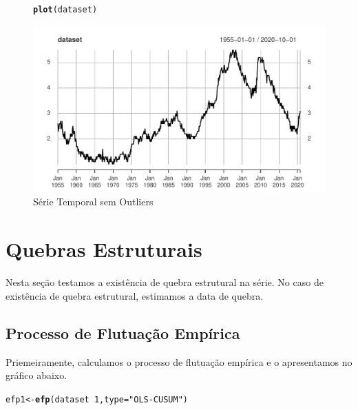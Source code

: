 \documentclass{article}\usepackage[]{graphicx}\usepackage[]{color}
\makeatletter
\def\maxwidth{ %
  \ifdim\Gin@nat@width>\linewidth
    \linewidth
  \else
    \Gin@nat@width
  \fi
}
\newcommand{\hlnum}[1]{\textcolor[rgb]{0.686,0.059,0.569}{#1}}%
\newcommand{\hlstr}[1]{\textcolor[rgb]{0.192,0.494,0.8}{#1}}%
\newcommand{\hlopt}[1]{\textcolor[rgb]{0,0,0}{#1}}%
\newcommand{\hlstd}[1]{\textcolor[rgb]{0.345,0.345,0.345}{#1}}%
\newcommand{\hlkwb}[1]{\textcolor[rgb]{0.69,0.353,0.396}{#1}}%
\newcommand{\hlkwc}[1]{\textcolor[rgb]{0.333,0.667,0.333}{#1}}%
\newcommand{\hlkwd}[1]{\textcolor[rgb]{0.737,0.353,0.396}{\textbf{#1}}}%
\newenvironment{kframe}{%
 \def\at@end@of@kframe{}%
 \ifinner\ifhmode%
  \def\at@end@of@kframe{\end{minipage}}%
  \begin{minipage}{\columnwidth}%
 \fi\fi%
 \def\FrameCommand##1{\hskip\@totalleftmargin \hskip-\fboxsep
 \colorbox{shadecolor}{##1}\hskip-\fboxsep
     \hskip-\linewidth \hskip-\@totalleftmargin \hskip\columnwidth}%
 \MakeFramed {\advance\hsize-\width
   \@totalleftmargin\z@ \linewidth\hsize
   \@setminipage}}%
 {\par\unskip\endMakeFramed%
 \at@end@of@kframe}
\newenvironment{knitrout}{}{} %
\makeatother
\begin{document}
    \begin{figure}[H]
    \caption{Série Temporal sem Outliers}
    \centering
\begin{knitrout}
\color{fgcolor}\begin{kframe}
\begin{alltt}
\hlkwd{plot}\hlstd{(dataset)}
\end{alltt}
\end{kframe}
\includegraphics[width=\maxwidth]{figure/unnamed-chunk-22-1} 

\end{knitrout}
    \end{figure}


\section{Quebras Estruturais}

    Nesta seção testamos a existência de quebra estrutural na série. No caso de existência de quebra estrutural, estimamos a data de quebra.

    \subsection{Processo de Flutuação Empírica}
    
        Priemeiramente, calculamos o processo de flutuação empírica e o apresentamos no gráfico abaixo.
    
\begin{knitrout}
\color{fgcolor}\begin{kframe}
\begin{alltt}
\hlstd{efp1} \hlkwb{<-} \hlkwd{efp}\hlstd{(dataset}\hlopt{~}\hlnum{1}\hlstd{,} \hlkwc{type}\hlstd{=}\hlstr{"OLS-CUSUM"}\hlstd{)}
\end{alltt}
\end{kframe}
\end{knitrout}
\end{document}

